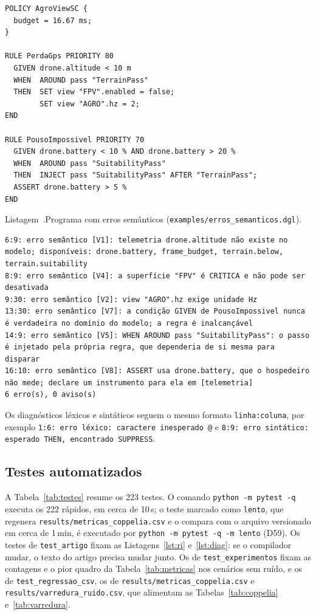 \documentclass[conference]{IEEEtran}
\renewcommand{\lstlistingname}{Listagem}
\newenvironment{blocolst}%
  {\par\medskip\noindent\begin{minipage}{\columnwidth}}%
  {\end{minipage}\par\medskip}
\newcommand{\legendalst}[2]{%
  \par\vspace{2pt}%
  \refstepcounter{lstlisting}\label{#1}%
  {\footnotesize\lstlistingname~\thelstlisting.\enspace #2\par}}
\begin{document}
\begin{blocolst}
\begin{lstlisting}[style=dsl]
POLICY AgroViewSC {
  budget = 16.67 ms;
}

RULE PerdaGps PRIORITY 80
  GIVEN drone.altitude < 10 m
  WHEN  AROUND pass "TerrainPass"
  THEN  SET view "FPV".enabled = false;
        SET view "AGRO".hz = 2;
END

RULE PousoImpossivel PRIORITY 70
  GIVEN drone.battery < 10 % AND drone.battery > 20 %
  WHEN  AROUND pass "SuitabilityPass"
  THEN  INJECT pass "SuitabilityPass" AFTER "TerrainPass";
  ASSERT drone.battery > 5 %
END
\end{lstlisting}
\legendalst{lst:erros}{Programa com erros semânticos
(\texttt{examples/\allowbreak erros\_semanticos.dgl}).}
\end{blocolst}

\begin{lstlisting}[style=saida,caption={Diagnósticos emitidos para a
Listagem~\ref{lst:erros}.},label={lst:diag}]
6:9: erro semântico [V1]: telemetria drone.altitude não existe no modelo; disponíveis: drone.battery, frame_budget, terrain.below, terrain.suitability
8:9: erro semântico [V4]: a superfície "FPV" é CRITICA e não pode ser desativada
9:30: erro semântico [V2]: view "AGRO".hz exige unidade Hz
13:30: erro semântico [V7]: a condição GIVEN de PousoImpossivel nunca é verdadeira no domínio do modelo; a regra é inalcançável
14:9: erro semântico [V5]: WHEN AROUND pass "SuitabilityPass": o passo é injetado pela própria regra, que dependeria de si mesma para disparar
16:10: erro semântico [V8]: ASSERT usa drone.battery, que o hospedeiro não mede; declare um instrumento para ela em [telemetria]
6 erro(s), 0 aviso(s)
\end{lstlisting}

Os diagnósticos léxicos e sintáticos seguem o mesmo formato
\texttt{linha:coluna}, por exemplo
\texttt{1:6: erro léxico: caractere inesperado \textquotesingle @\textquotesingle} e
\texttt{8:9: erro sintático: esperado \textquotesingle THEN\textquotesingle, encontrado \textquotesingle SUPPRESS\textquotesingle}.

\subsection{Testes automatizados}
\label{sec:testes}

A Tabela~\ref{tab:testes} resume os 223 testes. O comando
\texttt{python -m pytest -q} executa os 222 rápidos, em cerca de 10\,s; o teste
marcado como \texttt{lento}, que regenera \texttt{results/metricas\_coppelia.csv}
e o compara com o arquivo versionado em cerca de 1\,min, é executado por
\texttt{python -m pytest -q -m lento} (D59). Os testes de \texttt{test\_artigo}
fixam as Listagens~\ref{lst:ri} e~\ref{lst:diag}: se o compilador mudar, o
texto do artigo precisa mudar junto. Os de
\texttt{test\_experimentos} fixam as contagens e o pior quadro da
Tabela~\ref{tab:metricas} nos cenários sem ruído, e
os de \texttt{test\_regressao\_csv}, os de
\texttt{results/metricas\_coppelia.csv} e
\texttt{results/varredura\_ruido.csv}, que alimentam as
Tabelas~\ref{tab:coppelia} e~\ref{tab:varredura}.
\end{document}

